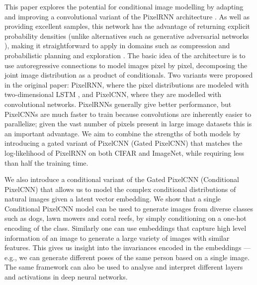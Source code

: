 \documentclass{article}
\begin{document}
This paper explores the potential for conditional image modelling by adapting and improving a convolutional variant of the PixelRNN architecture \cite{van2016pixel}. As well as providing excellent samples, this network has the advantage of returning explicit probability densities (unlike alternatives such as generative adversarial networks \cite{goodfellow2014generative, denton2015deep, reed2016generative}), making it straightforward to apply in domains such as compression \cite{van2014student} and probabilistic planning and exploration \cite{bellemare2016unifying}. The basic idea of the architecture is to use autoregressive connections to model images pixel by pixel, decomposing the joint image distribution as a product of conditionals. Two variants were proposed in the original paper: PixelRNN, where the pixel distributions are modeled with two-dimensional LSTM \cite{graves2009offline, theis2015generative}, and PixelCNN, where they are modelled with convolutional networks. PixelRNNs generally give better performance, but PixelCNNs are much faster to train because convolutions are inherently easier to parallelize; given the vast number of pixels present in large image datasets this is an important advantage. We aim to combine the strengths of both models by introducing a gated variant of PixelCNN (Gated PixelCNN) that matches the log-likelihood of PixelRNN on both CIFAR and ImageNet, while requiring less than half the training time.

We also introduce a conditional variant of the Gated PixelCNN (Conditional PixelCNN) that allows us to model the complex conditional distributions of natural images given a latent vector embedding. We show that a single Conditional PixelCNN model can be used to generate images from diverse classes such as dogs, lawn mowers and coral reefs, by simply conditioning on a one-hot encoding of the class. Similarly one can use embeddings that capture high level information of an image to generate a large variety of images with similar features. This gives us insight into the invariances encoded in the embeddings --- e.g., we can generate different poses of the same person based on a single image. The same framework can also be used to analyse and interpret different layers and activations in deep neural networks.
 
\end{document}
